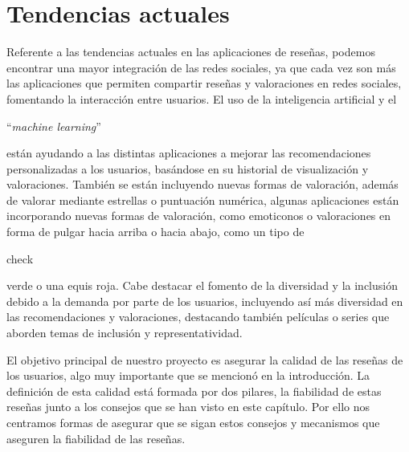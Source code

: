 \section{Tendencias actuales}

Referente a las tendencias actuales en las aplicaciones de reseñas, podemos encontrar una mayor integración de las redes sociales, ya que cada vez son más las aplicaciones que permiten compartir reseñas y valoraciones en redes sociales, fomentando la interacción entre usuarios. El uso de la inteligencia artificial\cite{ReviewsfAI} y el \begin{otherlanguage}{english}``\textit{machine learning}''\end{otherlanguage} \cite{MachLear} están ayudando a las distintas aplicaciones a mejorar\cite{ReviewsML} las recomendaciones personalizadas a los usuarios, basándose en su historial de visualización y valoraciones. También se están incluyendo nuevas formas de valoración, además de valorar mediante estrellas o puntuación numérica, algunas aplicaciones están incorporando nuevas formas de valoración, como emoticonos o valoraciones en forma de pulgar hacia arriba o hacia abajo, como un tipo de \begin{otherlanguage}{english}check \end{otherlanguage} verde o una equis roja. Cabe destacar el fomento de la diversidad y la inclusión debido a la demanda por parte de los usuarios, incluyendo así más diversidad en las recomendaciones y valoraciones, destacando también películas o series que aborden temas de inclusión y representatividad.


El objetivo principal de nuestro proyecto es asegurar la calidad de las reseñas de los usuarios, algo muy importante que se mencionó en la introducción. La definición de esta calidad está formada por dos pilares, la fiabilidad de estas reseñas junto a los consejos que se han visto en este capítulo. Por ello nos centramos formas de asegurar que se sigan estos consejos y mecanismos que aseguren la fiabilidad de las reseñas.  




